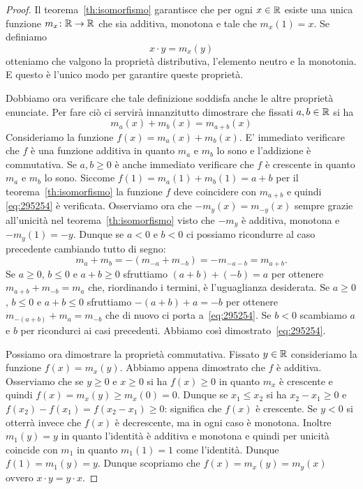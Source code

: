 %
\begin{proof}
Il teorema~\ref{th:isomorfismo} garantisce che 
per ogni $x\in {\mathbb R}$ esiste una unica funzione $m_x\colon {\mathbb R}\to{\mathbb R}$
che sia additiva, monotona e tale che $m_x(1)=x$.
Se definiamo 
\[
  x\cdot y = m_x(y)  
\]
otteniamo che valgono la proprietà distributiva, l'elemento neutro
e la monotonia. 
E questo è l'unico modo per garantire queste proprietà.

Dobbiamo ora verificare che tale definizione soddisfa anche le altre 
proprietà enunciate. 
Per fare ciò ci servirà innanzitutto dimostrare 
che fissati $a,b\in {\mathbb R}$ si ha 
\begin{equation}\label{eq:295254}
 m_a(x) + m_b(x) = m_{a+b}(x)  
\end{equation}
Consideriamo la funzione $f(x) = m_a(x) + m_b(x)$.
E' immediato verificare che $f$ è una funzione additiva
in quanto $m_a$ e $m_b$ lo sono e l'addizione è commutativa.
Se $a,b\ge 0$ è anche immediato verificare che $f$ è crescente 
in quanto $m_a$ e $m_b$ lo sono. 
Siccome $f(1) = m_a(1)+m_b(1)=a+b$ per il teorema~\ref{th:isomorfismo}
la funzione $f$ deve coincidere con $m_{a+b}$ e quindi 
\eqref{eq:295254} è verificata.
Osserviamo ora che $-m_y(x) = m_{-y}(x)$ sempre grazie all'unicità nel 
teorema~\ref{th:isomorfismo} visto che $-m_y$ è additiva, monotona 
e $-m_y(1)=-y$.
Dunque se $a<0$ e $b<0$ ci possiamo ricondurre al caso precedente 
cambiando tutto di segno:
\[
m_{a}+m_{b} = - (m_{-a}+m_{-b}) = - m_{-a -b} = m_{a+b}. 
\]
Se $a\ge 0$, $b\le 0$ e $a+b\ge 0$ sfruttiamo $(a+b) + (-b) = a$
per ottenere 
$m_{a+b} + m_{-b} = m_a$ che, riordinando i termini, 
è l'uguaglianza desiderata.
Se $a\ge 0$, $b\le 0$ e $a+b\le 0$ sfruttiamo $-(a+b) + a = -b$
per ottenere $m_{-(a+b)} + m_a = m_{-b}$ 
che di nuovo ci porta a~\eqref{eq:295254}.
Se $b<0$ scambiamo $a$ e $b$ per ricondurci ai casi precedenti.
Abbiamo così dimostrato~\eqref{eq:295254}.

Possiamo ora dimostrare la proprietà commutativa.
Fissato $y\in {\mathbb R}$ consideriamo la funzione $f(x) = m_x(y)$.
Abbiamo appena dimostrato che $f$ è additiva.
Osserviamo che se $y\ge 0$ e $x\ge 0$ si ha $f(x)\ge 0$ 
in quanto $m_x$ è crescente e quindi $f(x)=m_x(y) \ge m_x(0)=0$.
Dunque se $x_1\le x_2$ si ha $x_2-x_1\ge 0$ 
e $f(x_2)-f(x_1) = f(x_2-x_1)\ge 0$: significa 
che $f(x)$ è crescente. Se $y<0$ si otterrà invece che 
$f(x)$ è decrescente, ma in ogni caso è monotona.
Inoltre $m_1(y) = y$ in quanto l'identità è additiva 
e monotona e quindi per unicità coincide con $m_1$ 
in quanto $m_1(1)=1$ come l'identità.
Dunque $f(1) = m_1(y) = y$.
Dunque scopriamo che $f(x) = m_x(y) = m_y(x)$ ovvero 
$x\cdot y = y\cdot x$.


\end{proof}

